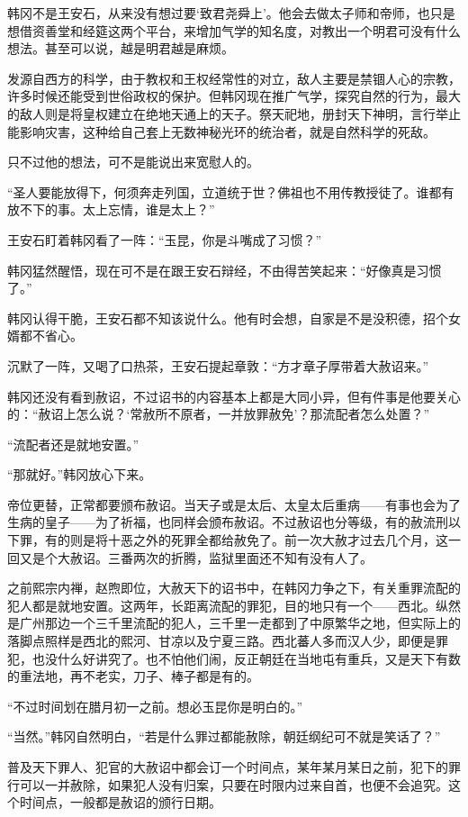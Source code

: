 韩冈不是王安石，从来没有想过要‘致君尧舜上’。他会去做太子师和帝师，也只是想借资善堂和经筵这两个平台，来增加气学的知名度，对教出一个明君可没有什么想法。甚至可以说，越是明君越是麻烦。

发源自西方的科学，由于教权和王权经常性的对立，敌人主要是禁锢人心的宗教，许多时候还能受到世俗政权的保护。但韩冈现在推广气学，探究自然的行为，最大的敌人则是将皇权建立在绝地天通上的天子。祭天祀地，册封天下神明，言行举止能影响灾害，这种给自己套上无数神秘光环的统治者，就是自然科学的死敌。

只不过他的想法，可不是能说出来宽慰人的。

“圣人要能放得下，何须奔走列国，立道统于世？佛祖也不用传教授徒了。谁都有放不下的事。太上忘情，谁是太上？”

王安石盯着韩冈看了一阵：“玉昆，你是斗嘴成了习惯？”

韩冈猛然醒悟，现在可不是在跟王安石辩经，不由得苦笑起来：“好像真是习惯了。”

韩冈认得干脆，王安石都不知该说什么。他有时会想，自家是不是没积德，招个女婿都不省心。

沉默了一阵，又喝了口热茶，王安石提起章敦：“方才章子厚带着大赦诏来。”

韩冈还没有看到赦诏，不过诏书的内容基本上都是大同小异，但有件事是他要关心的：“赦诏上怎么说？‘常赦所不原者，一并放罪赦免’？那流配者怎么处置？”

“流配者还是就地安置。”

“那就好。”韩冈放心下来。

帝位更替，正常都要颁布赦诏。当天子或是太后、太皇太后重病——有事也会为了生病的皇子——为了祈福，也同样会颁布赦诏。不过赦诏也分等级，有的赦流刑以下罪，有的则是将十恶之外的死罪全都给赦免了。前一次大赦才过去几个月，这一回又是个大赦诏。三番两次的折腾，监狱里面还不知有没有人了。

之前熙宗内禅，赵煦即位，大赦天下的诏书中，在韩冈力争之下，有关重罪流配的犯人都是就地安置。这两年，长距离流配的罪犯，目的地只有一个——西北。纵然是广州那边一个三千里流配的犯人，三千里一走都到了中原繁华之地，但实际上的落脚点照样是西北的熙河、甘凉以及宁夏三路。西北蕃人多而汉人少，即便是罪犯，也没什么好讲究了。也不怕他们闹，反正朝廷在当地屯有重兵，又是天下有数的重法地，再不老实，刀子、棒子都是有的。

“不过时间划在腊月初一之前。想必玉昆你是明白的。”

“当然。”韩冈自然明白，“若是什么罪过都能赦除，朝廷纲纪可不就是笑话了？”

普及天下罪人、犯官的大赦诏中都会订一个时间点，某年某月某日之前，犯下的罪行可以一并赦除，如果犯人没有归案，只要在时限内过来自首，也便不会追究。这个时间点，一般都是赦诏的颁行日期。

